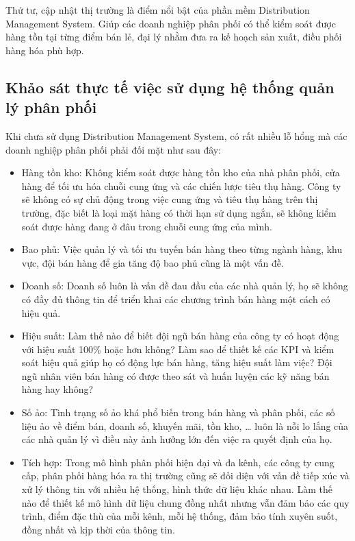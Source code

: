 Thứ tư, cập nhật thị trường là điểm nổi bật của phần mềm 
Distribution Management System. Giúp các doanh nghiệp phân phối có thể
kiểm soát được hàng tồn tại từng điểm bán lẻ, đại lý nhằm
đưa ra kế hoạch sản xuất, điều phối hàng hóa phù hợp.

\subsection{Khảo sát thực tế việc sử dụng hệ thống quản lý phân phối}
Khi chưa sử dụng Distribution Management System, có rất nhiều
lỗ hổng mà các doanh nghiệp phân phối phải đối mặt như sau đây:
\begin{itemize}[topsep=0ex]
\item Hàng tồn kho: Không kiểm soát được hàng tồn kho của nhà
    phân phối, cửa hàng để tối ưu hóa chuỗi cung ứng và các
    chiến lược tiêu thụ hàng. Công ty sẽ không có sự chủ động trong
    việc cung ứng và tiêu thụ hàng trên thị trường, đặc biết là loại
    mặt hàng có thời hạn sử dụng ngắn, sẽ không kiểm soát được hàng
    đang ở đâu trong chuỗi cung ứng của mình.

\item Bao phủ: Việc quản lý và tối ưu tuyến bán hàng theo từng
    ngành hàng, khu vực, đội bán hàng để gia tăng độ bao phủ
    cũng là một vấn đề.

\item Doanh số: Doanh số luôn là vấn đề đau đầu của các nhà quản lý,
    họ sẽ không có đầy đủ thông tin để triển khai các chương trình
    bán hàng một cách có hiệu quả.

\item Hiệu suất: Làm thế nào để biết đội ngũ bán hàng của công ty
    có hoạt động với hiệu suất 100\% hoặc hơn không? Làm sao để
    thiết kế các KPI và kiểm soát hiệu quả giúp họ có động lực bán
    hàng, tăng hiệu suất làm việc? Đội ngũ nhân viên bán hàng có
    được theo sát và huấn luyện các kỹ năng bán hàng hay không?

\item Số ảo: Tình trạng số ảo khá phổ biến trong bán hàng và phân phối,
    các số liệu ảo về điểm bán, doanh số, khuyến mãi, tồn kho, …
    luôn là nỗi lo lắng của các nhà quản lý vì điều này ảnh hưởng lớn
    đến việc ra quyết định của họ.

\item Tích hợp: Trong mô hình phân phối hiện đại và đa kênh, các công
    ty cung cấp, phân phối hàng hóa ra thị trường cũng sẽ đối diện
    với vấn đề tiếp xúc và xử lý thông tin với nhiều hệ thống, hình
    thức dữ liệu khác nhau. Làm thế nào để thiết kế mô hình dữ liệu
    chung đồng nhất nhưng vẫn đảm bảo các quy trình, điểm đặc thù
    của mỗi kênh, mỗi hệ thống, đảm bảo tính xuyên suốt, đồng nhất
    và kịp thời của thông tin.
\end{itemize}

